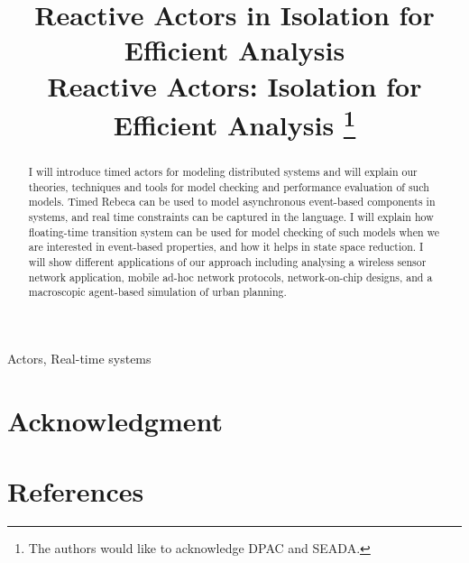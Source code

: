 \documentclass[conference]{IEEEtran}
\begin{document}
	
	\title{Reactive Actors in Isolation for Efficient Analysis 
	\\ Reactive Actors: Isolation for Efficient Analysis 
		\thanks{The authors would like to acknowledge DPAC and SEADA.}
	}
	
	\author{
		\and
		\and
	}
	
	\maketitle
	
	\begin{abstract}
		I will introduce timed actors for modeling distributed systems and will explain our theories, techniques and tools for model checking and performance evaluation of such models. Timed Rebeca can be used to model asynchronous event-based components in systems, and real time constraints can be captured in the language. I will explain how floating-time transition system can be used for model checking of such models when we are interested in event-based properties, and how it helps in state space reduction. I will show different applications of our approach including analysing a wireless sensor network application, mobile ad-hoc network protocols, network-on-chip designs, and a macroscopic agent-based simulation of urban planning.
	\end{abstract}
	
	\begin{IEEEkeywords}
		Actors, Real-time systems\end{IEEEkeywords}
	









	
	
	
	\section*{Acknowledgment}
	\section*{References}
	
	
	
	
	
	
\end{document}
